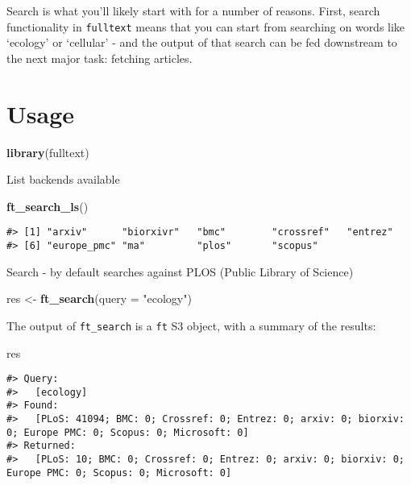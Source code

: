 \documentclass[]{book}
\newenvironment{Shaded}{\begin{snugshade}}{\end{snugshade}}
\newcommand{\DataTypeTok}[1]{\textcolor[rgb]{0.13,0.29,0.53}{#1}}
\newcommand{\KeywordTok}[1]{\textcolor[rgb]{0.13,0.29,0.53}{\textbf{#1}}}
\newcommand{\NormalTok}[1]{#1}
\newcommand{\StringTok}[1]{\textcolor[rgb]{0.31,0.60,0.02}{#1}}
\theoremstyle{definition}
\theoremstyle{definition}
\theoremstyle{definition}
\theoremstyle{remark}
\begin{document}
Search is what you'll likely start with for a number of reasons. First,
search functionality in \texttt{fulltext} means that you can start from
searching on words like `ecology' or `cellular' - and the output of that
search can be fed downstream to the next major task: fetching articles.

\hypertarget{usage}{%
\section{Usage}\label{usage}}

\begin{Shaded}
\begin{Highlighting}[]
\KeywordTok{library}\NormalTok{(fulltext)}
\end{Highlighting}
\end{Shaded}

List backends available

\begin{Shaded}
\begin{Highlighting}[]
\KeywordTok{ft_search_ls}\NormalTok{()}
\end{Highlighting}
\end{Shaded}

\begin{verbatim}
#> [1] "arxiv"      "biorxivr"   "bmc"        "crossref"   "entrez"    
#> [6] "europe_pmc" "ma"         "plos"       "scopus"
\end{verbatim}

Search - by default searches against PLOS (Public Library of Science)

\begin{Shaded}
\begin{Highlighting}[]
\NormalTok{res <-}\StringTok{ }\KeywordTok{ft_search}\NormalTok{(}\DataTypeTok{query =} \StringTok{"ecology"}\NormalTok{)}
\end{Highlighting}
\end{Shaded}

The output of \texttt{ft\_search} is a \texttt{ft} S3 object, with a
summary of the results:

\begin{Shaded}
\begin{Highlighting}[]
\NormalTok{res}
\end{Highlighting}
\end{Shaded}

\begin{verbatim}
#> Query:
#>   [ecology] 
#> Found:
#>   [PLoS: 41094; BMC: 0; Crossref: 0; Entrez: 0; arxiv: 0; biorxiv: 0; Europe PMC: 0; Scopus: 0; Microsoft: 0] 
#> Returned:
#>   [PLoS: 10; BMC: 0; Crossref: 0; Entrez: 0; arxiv: 0; biorxiv: 0; Europe PMC: 0; Scopus: 0; Microsoft: 0]
\end{verbatim}
\end{document}
